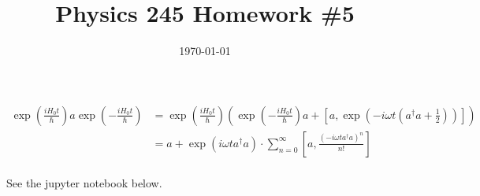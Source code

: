 \documentclass{article}
\date{\today}
\title{Physics 245 Homework \#5}
\begin{document}
\maketitle

\begin{prob}
\end{prob}
\begin{align*}
    \exp \left( \frac{i H_0 t}{\hbar} \right) a \exp \left( - \frac{i H_0 t}{\hbar} \right) &= \exp \left( \frac{i H_0 t}{\hbar} \right) \left( \exp \left( - \frac{i H_0 t}{\hbar} \right) a + \left[ a, \exp \left( - i \omega t \left( a^\dag a + \frac{1}{2} \right)  \right)  \right] \right) \\
                                                                                    &= a + \exp \left( i\omega t a^\dag a \right) \cdot \sum_{n=0}^\infty \left[ a, \frac{(-i \omega t a^\dag a)^n}{n!} \right] \\
\end{align*}

\bigskip
\begin{prob}
\end{prob}
See the jupyter notebook below.

\bigskip
\begin{prob}
\end{prob}



\end{document}
